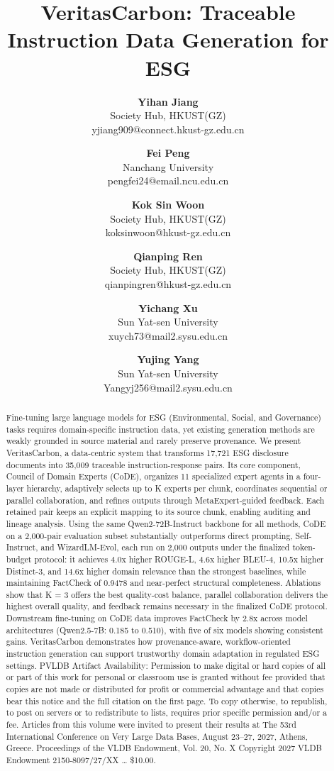 \documentclass[9pt,twocolumn]{extarticle}
\title{\textbf{\sffamily\fontsize{18}{22}\selectfont VeritasCarbon: Traceable Instruction Data Generation for ESG}}
\author{%
\normalsize
\textbf{Yihan Jiang}\\ Society Hub, HKUST(GZ)\\ yjiang909@connect.hkust-gz.edu.cn
\and
\textbf{Fei Peng}\\ Nanchang University\\ pengfei24@email.ncu.edu.cn
\and
\textbf{Kok Sin Woon}\\ Society Hub, HKUST(GZ)\\ koksinwoon@hkust-gz.edu.cn
\and
\textbf{Qianping Ren}\\ Society Hub, HKUST(GZ)\\ qianpingren@hkust-gz.edu.cn
\and
\textbf{Yichang Xu}\\ Sun Yat-sen University\\ xuych73@mail2.sysu.edu.cn
\and
\textbf{Yujing Yang}\\ Sun Yat-sen University\\ Yangyj256@mail2.sysu.edu.cn
}
\date{\vspace{-2ex}}
\begin{document}
\maketitle
\begin{abstract}
Fine-tuning large language models for ESG (Environmental, Social, and
Governance) tasks requires domain-specific instruction data, yet
existing generation methods are weakly grounded in source material and
rarely preserve provenance. We present VeritasCarbon, a data-centric
system that transforms 17,721 ESG disclosure documents into 35,009
traceable instruction-response pairs. Its core component, Council of
Domain Experts (CoDE), organizes 11 specialized expert agents in a
four-layer hierarchy, adaptively selects up to K experts per chunk,
coordinates sequential or parallel collaboration, and refines outputs
through MetaExpert-guided feedback. Each retained pair keeps an explicit
mapping to its source chunk, enabling auditing and lineage analysis.
Using the same Qwen2-72B-Instruct backbone for all methods, CoDE on a
2,000-pair evaluation subset substantially outperforms direct prompting,
Self-Instruct, and WizardLM-Evol, each run on 2,000 outputs under the
finalized token-budget protocol: it achieves 4.0x higher ROUGE-L, 4.6x
higher BLEU-4, 10.5x higher Distinct-3, and 14.6x higher domain
relevance than the strongest baselines, while maintaining FactCheck of
0.9478 and near-perfect structural completeness. Ablations show that K =
3 offers the best quality-cost balance, parallel collaboration delivers
the highest overall quality, and feedback remains necessary in the
finalized CoDE protocol. Downstream fine-tuning on CoDE data improves
FactCheck by 2.8x across model architectures (Qwen2.5-7B: 0.185 to
0.510), with five of six models showing consistent gains. VeritasCarbon
demonstrates how provenance-aware, workflow-oriented instruction
generation can support trustworthy domain adaptation in regulated ESG
settings.
PVLDB Artifact Availability:
Permission to make digital or hard copies of all or part of this work
for personal or classroom use is granted without fee provided that
copies are not made or distributed for profit or commercial advantage
and that copies bear this notice and the full citation on the first
page. To copy otherwise, to republish, to post on servers or to
redistribute to lists, requires prior specific permission and/or a fee.
Articles from this volume were invited to present their results at The
53rd International Conference on Very Large Data Bases, August 23--27,
2027, Athens, Greece.
Proceedings of the VLDB Endowment, Vol. 20, No. X
Copyright 2027 VLDB Endowment 2150-8097/27/XX \ldots{} \$10.00.
\end{abstract}
\end{document}
